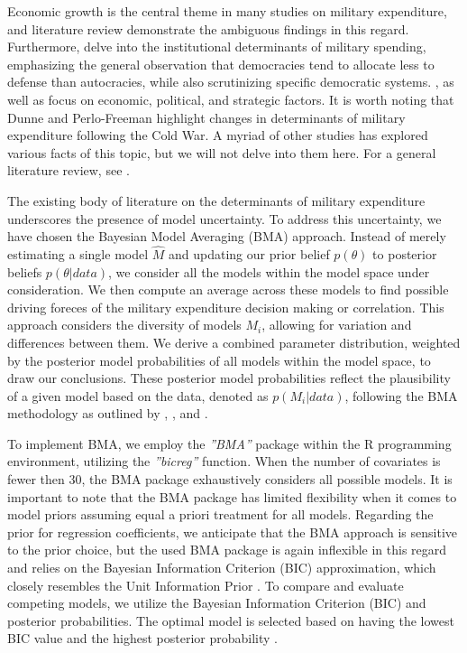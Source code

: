 \documentclass[12pt,a4paper]{article}
\begin{document}
Economic growth is the central theme in many studies on military expenditure, and \citet{lin2019} literature review demonstrate the ambiguous findings in this regard. Furthermore, \citet{albalate2012} delve into the institutional determinants of military spending, emphasizing the general observation that democracies tend to allocate less to defense than autocracies, while also scrutinizing specific democratic systems. \citet{dunne2003a,dunne2003b}, as well as \citet{nikolaidou2008} focus on economic, political, and strategic factors. It is worth noting that Dunne and Perlo-Freeman highlight changes in determinants of military expenditure following the Cold War. A myriad of other studies has explored various facts of this topic, but we will not delve into them here. For a general literature review, see \citet{albalate2012}. 

The existing body of literature on the determinants of military expenditure underscores the presence of model uncertainty. To address this uncertainty, we have chosen the Bayesian Model Averaging (BMA) approach. Instead of merely estimating a single model $\hat{M}$ and updating our prior belief $p(\theta)$ to posterior beliefs $p(\theta \vert data)$, we consider all the models within the model space under consideration. We then compute an average across these models to find possible driving foreces of the military expenditure decision making or correlation. This approach considers the diversity of models $M_{i}$, allowing for variation and differences between them. We derive a combined parameter distribution, weighted by the posterior model probabilities of all models within the model space, to draw our conclusions. These posterior model probabilities reflect the plausibility of a given model based on the data, denoted as $p(M_{i}\vert data)$, following the BMA methodology as outlined by \citet{steel2020}, \citet{brown2002},  \citet{hoeting1999} and \citet{moral2015}.

To implement BMA, we employ the \textit{''BMA''} package within the R programming environment, utilizing the \textit{''bicreg''} function. When the number of covariates is fewer then 30, the BMA package exhaustively considers all possible models. It is important to note that the BMA package has limited flexibility when it comes to model priors assuming equal a priori treatment for all models. Regarding the prior for regression coefficients, we anticipate that the BMA approach is sensitive to the prior choice, but the used BMA package is again inflexible in this regard and relies on the Bayesian Information Criterion (BIC) approximation, which closely resembles the Unit Information Prior \citep{amini2012}. To compare and evaluate competing models, we utilize the Bayesian Information Criterion (BIC) and posterior probabilities. The optimal model is selected based on having the lowest BIC value and the highest posterior probability \citep{starkweather2011}.
\end{document}
